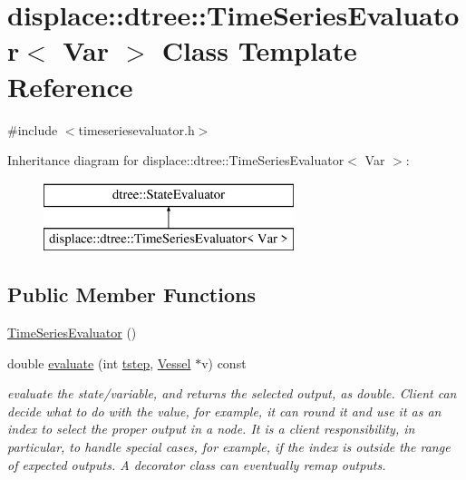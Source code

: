 \hypertarget{classdisplace_1_1dtree_1_1_time_series_evaluator}{}\section{displace\+::dtree\+::Time\+Series\+Evaluator$<$ Var $>$ Class Template Reference}
\label{classdisplace_1_1dtree_1_1_time_series_evaluator}


{\ttfamily \#include $<$timeseriesevaluator.\+h$>$}

Inheritance diagram for displace\+::dtree\+::Time\+Series\+Evaluator$<$ Var $>$\+:\begin{figure}[H]
\begin{center}
\leavevmode
\includegraphics[height=2.000000cm]{d8/d34/classdisplace_1_1dtree_1_1_time_series_evaluator}
\end{center}
\end{figure}
\subsection*{Public Member Functions}
\begin{DoxyCompactItemize}
\item 
\mbox{\hyperlink{classdisplace_1_1dtree_1_1_time_series_evaluator_a148e9dd081b0cafa5d576c20dca37a53}{Time\+Series\+Evaluator}} ()
\item 
double \mbox{\hyperlink{classdisplace_1_1dtree_1_1_time_series_evaluator_aca42c6a8684a9bc24d335817d6742f84}{evaluate}} (int \mbox{\hyperlink{thread__vessels_8cpp_a84bc73d278de929ec9974e1a95d9b23a}{tstep}}, \mbox{\hyperlink{class_vessel}{Vessel}} $\ast$v) const
\begin{DoxyCompactList}\small\item\em evaluate the state/variable, and returns the selected output, as double. Client can decide what to do with the value, for example, it can round it and use it as an index to select the proper output in a node. It is a client responsibility, in particular, to handle special cases, for example, if the index is outside the range of expected outputs. A decorator class can eventually remap outputs. \end{DoxyCompactList}\end{DoxyCompactItemize}


